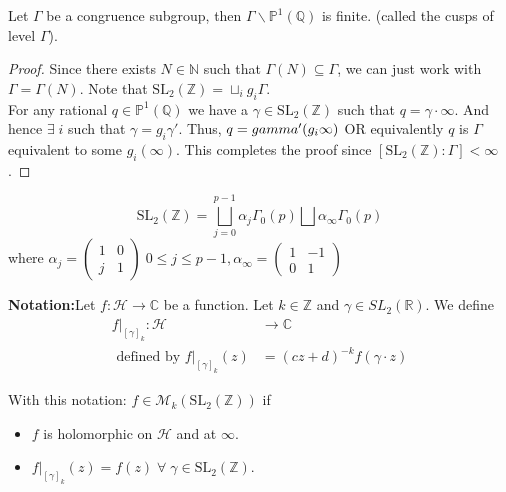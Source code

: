\documentclass[oneside, 12pt]{scrbook}
\newcommand{\CC}{\mathbb C}
\newcommand{\NN}{\mathbb N}
\newcommand{\QQ}{\mathbb Q}
\newcommand{\RR}{\mathbb R}
\newcommand{\ZZ}{\mathbb Z}
\newcommand{\PP}{\mathbb{P}}
\newcommand{\SL}{\mathrm{SL}}
\newcommand{\Hh}{\mathcal{H}}
\newcommand{\Mm}{\mathcal{M}}
\theoremstyle{theorem}
\begin{document}
\begin{proposition}
Let $\Gamma$ be a congruence subgroup, then $\Gamma\backslash\PP^1 (\QQ)$ is finite. (called the cusps of level $\Gamma$). 
\end{proposition}

\begin{proof}
Since there exists $N \in \NN$ such that $\Gamma (N) \subseteq \Gamma$, we can just work with $\Gamma = \Gamma(N)$. Note that $\SL_{2}(\ZZ) = \sqcup_{i} g_{i} \Gamma$. \\
For any rational $q \in \PP^1(\QQ)$ we have a $\gamma \in \SL_{2}(\ZZ)$ such that $q = \gamma \cdot \infty$. And hence $\exists \; i $ such that $\gamma =g_{i} \gamma '$. Thus, $q = \\gamma ' (g_{i} \infty)$ OR equivalently $q$ is $\Gamma$ equivalent to some $g_{i}(\infty)$. This completes the proof since $[\SL_{2}(\ZZ): \Gamma] < \infty$.
\end{proof}

\begin{exercise}
$$\SL_{2}(\ZZ) = \bigsqcup_{j=0}^{p-1} \alpha_{j} \Gamma_{0}(p) \bigsqcup \alpha_{\infty} \Gamma_{0}(p)$$ where $\alpha_{j} = \begin{pmatrix}
1 & 0 \\ j & 1
\end{pmatrix}\; 0 
\le j \le p-1 ,  \alpha_{\infty} = \begin{pmatrix}
1 & -1 \\ 0 & 1
\end{pmatrix}$
\end{exercise}

\textbf{Notation:}Let $f: \Hh \rightarrow \CC$ be a function. Let $k \in \ZZ$ and $\gamma \in SL_{2}(\RR)$. We define 
\begin{align*}
f|_{[\gamma]_{k}} : \Hh &\rightarrow \CC \\
\text{ defined by } f|_{[\gamma]_{k}}(z) &= (cz+d)^{-k} f(\gamma \cdot z)
\end{align*}

With this notation: $f \in \Mm_{k}(\SL_{2}(\ZZ))$ if 
\begin{itemize}
\item $f$ is holomorphic on $\Hh$ and at $\infty$.
\item $f|_{[\gamma]_{k}}(z) = f(z) \; \forall \; \gamma \in \SL_{2}(\ZZ)$. 
\end{itemize}
\end{document}
